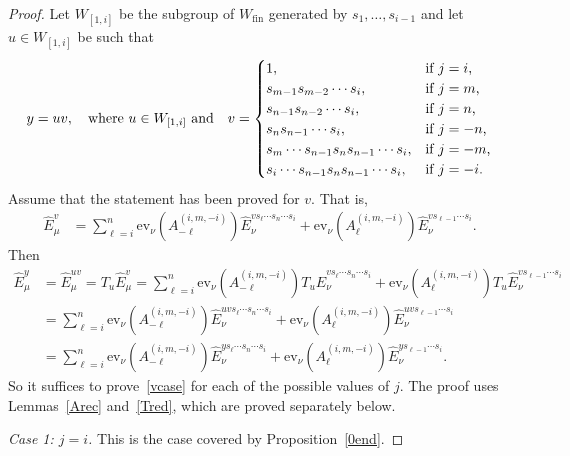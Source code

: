 \documentclass[11pt]{article}
\theoremstyle{plain}
\theoremstyle{definition}
\theoremstyle{remark}
\numberwithin{equation}{section}
\def\ev{\mathrm{ev}}
\newcounter{r}
\newcounter{s}
\begin{document}
\begin{proof} 



Let $W_{[1,i]}$ be the subgroup of $W_{\mathrm{fin}}$ generated by $s_1, \ldots, s_{i-1}$ and let
$u\in W_{[1,i]}$ be such that
$$y=uv,\quad\hbox{where $u\in W_{[1,i]}$ and}
\quad
v = \begin{cases}
1, &\hbox{if $j=i$,} \\
s_{m-1}s_{m-2}\cdots s_i, &\hbox{if $j=m$,} \\
s_{n-1}s_{n-2}\cdots s_i, &\hbox{if $j=n$,} \\
s_n s_{n-1}\cdots s_i, &\hbox{if $j=-n$,} \\
s_m\cdots s_{n-1}s_n s_{n-1}\cdots s_i, &\hbox{if $j=-m$,} \\
s_i\cdots s_{n-1}s_n s_{n-1}\cdots s_i, &\hbox{if $j=-i$.}
\end{cases}
$$
Assume that the statement has been proved for $v$. That is,
\begin{align}
\widehat{E}^v_\mu 
&=\sum_{\ell = i}^n \ev_\nu(A^{(i,m,-i)}_{-\ell}) \widehat{E}^{vs_\ell \cdots s_n\cdots s_i}_\nu
+\ev_\nu(A^{(i,m,-i)}_{\ell}) \widehat{E}^{vs_{\ell-1} \cdots s_i}_\nu.
\label{vcase}
\end{align}
Then
\begin{align*}
\widehat{E}^{y}_\mu 
&= \widehat{E}^{uv}_\mu 
= T_u \widehat{E}^{v}_\mu 
=\sum_{\ell = i}^n \ev_\nu(A^{(i,m,-i)}_{-\ell}) T_u\widehat{E}^{vs_\ell \cdots s_n\cdots s_i}_\nu
+\ev_\nu(A^{(i,m,-i)}_{\ell}) T_u\widehat{E}^{vs_{\ell-1} \cdots s_i}_\nu
\\
&=\sum_{\ell = i}^n \ev_\nu(A^{(i,m,-i)}_{-\ell}) \widehat{E}^{uvs_\ell \cdots s_n\cdots s_i}_\nu
+\ev_\nu(A^{(i,m,-i)}_{\ell}) \widehat{E}^{uvs_{\ell-1} \cdots s_i}_\nu
\\
&=\sum_{\ell = i}^n \ev_\nu(A^{(i,m,-i)}_{-\ell}) \widehat{E}^{ys_\ell \cdots s_n\cdots s_i}_\nu
+\ev_\nu(A^{(i,m,-i)}_{\ell}) \widehat{E}^{ys_{\ell-1} \cdots s_i}_\nu.
\end{align*}
So it suffices to prove~\eqref{vcase} for each of the possible values of $j$.
The proof uses Lemmas~\ref{Arec} and~\ref{Tred}, which are proved separately below.


\noindent
\emph{Case 1:  $j=i$.}
This is the case covered by Proposition~\ref{0end}.


\end{proof}
\end{document}
